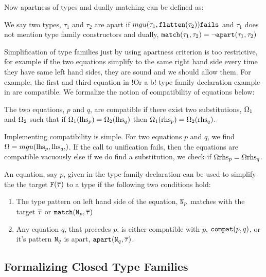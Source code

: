 \documentclass[format=acmsmall,manuscript,review,screen,nonacm,margin=1in,11pt]{acmart}
\begin{document}
Now apartness of types and dually matching can be defined as:
\begin{defn}\label{def:apart-match-ty}
  We say two types, $\tau_1$ and $\tau_2$ are apart if $mgu(\tau_1,\texttt{flatten}(\tau_2))\texttt{fails}$ and $\tau_1$ does not
  mention type family constructors and dually, $\texttt{match}(\tau_1, \tau_2) = \lnot\texttt{apart}(\tau_1, \tau_2)$
\end{defn}
Simplification of type families just by using apartness criterion is too restrictive,
for example if the two equations simplify to the
same right hand side every time they have same left hand sides,
they are sound and we should allow them. For example, the first and third equation in
!Or a b! type family declaration example in  are compatible.
We formalize the notion of compatibility of equations below:
\begin{defn}\label{def:compact-eq}
  The two equations, $p$ and $q$, are compatible
  if there exist two substitutions, $\Omega_1$ and $\Omega_2$ such that
  if $\Omega_1(\text{lhs}_{p}) = \Omega_2(\text{lhs}_{q})$ then $\Omega_1(\text{rhs}_{p}) = \Omega_2(\text{rhs}_{q})$.
\end{defn}
Implementing compatibility is simple. For two equations $p$ and $q$, we find $\Subst = \mgu{\lhs p, \lhs q}$.
If the call to unification fails, then the equations are compatible vacuously else if we do find a substitution,
we check if $\Omega\text{rhs}_{p} = \Omega\text{rhs}_{q}$. 
\begin{defn}\label{def:cft-simpl}
  An equation, say $p$, given in the type family declaration can be used to simplify the the
  target $\texttt{F}(\overline{\tau})$ to a type if the following two conditions hold:
  \begin{enumerate}
  \item The type pattern on left hand side of the equation, $\texttt{N}_p$ matches with the
    target $\overline{\tau}$ or $\texttt{match}(\texttt{N}_p, \overline{\tau})$
  \item Any equation $q$, that precedes $p$, is either compatible with $p$, $\texttt{compat}(p, q)$,
    or it's pattern $\texttt{N}_q$ is apart, $\texttt{apart}(\texttt{N}_q, \overline{\tau})$.
  \end{enumerate}
\end{defn}


\subsection{Formalizing Closed Type Families}\label{subsec:tf-closed-formal}
\end{document}
